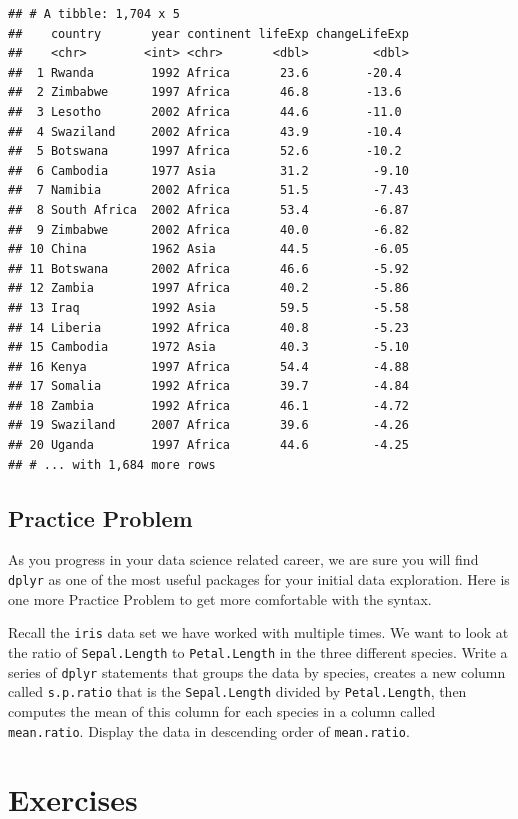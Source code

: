 \documentclass[
]{krantz}
\begin{document}
\begin{verbatim}
## # A tibble: 1,704 x 5
##    country       year continent lifeExp changeLifeExp
##    <chr>        <int> <chr>       <dbl>         <dbl>
##  1 Rwanda        1992 Africa       23.6        -20.4 
##  2 Zimbabwe      1997 Africa       46.8        -13.6 
##  3 Lesotho       2002 Africa       44.6        -11.0 
##  4 Swaziland     2002 Africa       43.9        -10.4 
##  5 Botswana      1997 Africa       52.6        -10.2 
##  6 Cambodia      1977 Asia         31.2         -9.10
##  7 Namibia       2002 Africa       51.5         -7.43
##  8 South Africa  2002 Africa       53.4         -6.87
##  9 Zimbabwe      2002 Africa       40.0         -6.82
## 10 China         1962 Asia         44.5         -6.05
## 11 Botswana      2002 Africa       46.6         -5.92
## 12 Zambia        1997 Africa       40.2         -5.86
## 13 Iraq          1992 Asia         59.5         -5.58
## 14 Liberia       1992 Africa       40.8         -5.23
## 15 Cambodia      1972 Asia         40.3         -5.10
## 16 Kenya         1997 Africa       54.4         -4.88
## 17 Somalia       1992 Africa       39.7         -4.84
## 18 Zambia        1992 Africa       46.1         -4.72
## 19 Swaziland     2007 Africa       39.6         -4.26
## 20 Uganda        1997 Africa       44.6         -4.25
## # ... with 1,684 more rows
\end{verbatim}

\hypertarget{ch6PP6}{%
\subsection{Practice Problem}\label{ch6PP6}}

As you progress in your data science related career, we are sure you will find \texttt{dplyr} as one of the most useful packages for your initial data exploration. Here is one more Practice Problem to get more comfortable with the syntax.

Recall the \texttt{iris} data set we have worked with multiple times. We want to look at the ratio of \texttt{Sepal.Length} to \texttt{Petal.Length} in the three different species. Write a series of \texttt{dplyr} statements that groups the data by species, creates a new column called \texttt{s.p.ratio} that is the \texttt{Sepal.Length} divided by \texttt{Petal.Length}, then computes the mean of this column for each species in a column called \texttt{mean.ratio}. Display the data in descending order of \texttt{mean.ratio}.

\hypertarget{ch6Ex}{%
\section{Exercises}\label{ch6Ex}}
\end{document}
